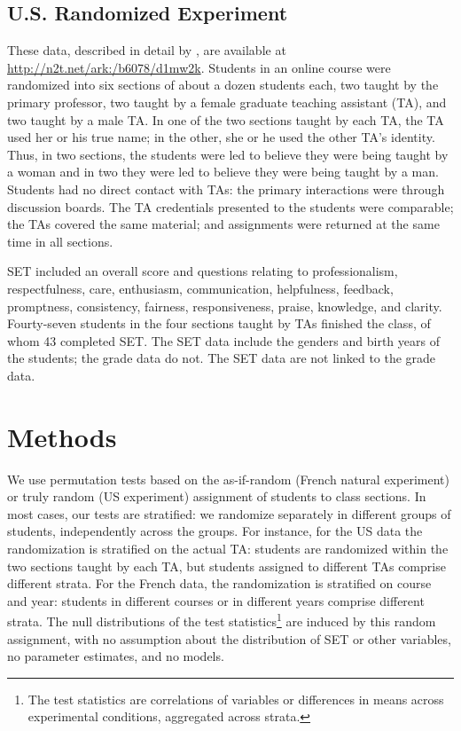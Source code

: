 \documentclass[12pt]{article}
\begin{document}
\subsection{U.S. Randomized Experiment}
These data, described in detail by \cite{MacNell2014}, are available at 
\url{http://n2t.net/ark:/b6078/d1mw2k}.
Students in an online course were randomized into six sections of about a dozen students each, 
two taught by the primary professor,
two taught by a female graduate teaching assistant (TA), and two taught by a male TA.
In one of the two sections taught by each TA, the TA used her or his
true name; in the other, she or he used the other TA's identity.
Thus, in two sections, the students were led to believe they were being taught by a woman
and in two they were led to believe they were being taught by a man.
Students had no direct contact with TAs: the primary interactions were through
discussion boards.
The TA credentials presented to the students were comparable; the TAs covered
the same material; and assignments were returned at the same time in all sections.

SET included an overall score and questions relating to
professionalism, respectfulness, care, enthusiasm, communication, helpfulness,
feedback, promptness, consistency, fairness, responsiveness, praise, knowledge, 
and clarity.
Fourty-seven students in the four sections taught by TAs finished the class,
of whom 43 completed SET.
The SET data include the genders and birth years of the students; the grade data do not.
The SET data are not linked to the grade data.

\section{Methods} \label{sec:methods}
We use permutation tests based on the as-if-random (French natural experiment)
or truly random (US experiment) assignment of students
to class sections.
In most cases, our tests are stratified: we randomize separately in different
groups of students, independently across the groups.
For instance, for the US data the randomization is stratified on the actual TA:
students are randomized within the two sections taught by each TA,
but students assigned to different TAs comprise different strata.
For the French data, the randomization is stratified on course and year:
students in different courses or in different years comprise different strata.
The null distributions of the test statistics\footnote{%
 The test statistics are correlations of variables or differences in means across experimental
 conditions, aggregated across strata.
}
are induced by this random
assignment, with no assumption about the distribution of SET or other variables, 
no parameter estimates, and no models.
\end{document}
